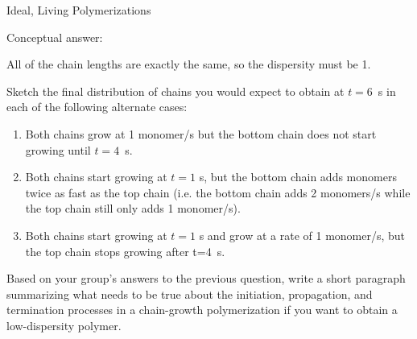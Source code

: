 \begin{activity}{Ideal, Living Polymerizations}
\begin{ctqs}
\begin{solution}[1.5in]
					Conceptual answer:
					
						All of the chain lengths are exactly the same, so the dispersity must be 1.
						
				\end{solution}

	\question Sketch the final distribution of chains you would expect to obtain at $t=6$~s in each of the following alternate cases:

		\begin{enumerate}

			\item Both chains grow at 1 monomer/s but the bottom chain does not start growing until $t=4$~s.
			
				\begin{solution}[0.55in]\studentdisplay{~
				}
				\end{solution}

			\item Both chains start growing at $t=1$ s, but the bottom chain adds monomers twice as fast as the top chain (i.e. the bottom chain adds 2 monomers/s while the top chain still only adds 1 monomer/s).
			
				\begin{solution}[0.5in]\studentdisplay{~
				}
				\end{solution}

			\item Both chains start growing at $t=1$ s and grow at a rate of 1 monomer/s, but the top chain stops growing after t=4~s.
			
				\begin{solution}[0.5in]\studentdisplay{~
				}
				\end{solution}
				
		\end{enumerate}
		
	\question Based on your group's answers to the previous question, write a short paragraph summarizing what needs to be true about the initiation, propagation, and termination processes in a chain-growth polymerization if you want to obtain a low-dispersity polymer.
	

\end{ctqs}
\end{activity}
